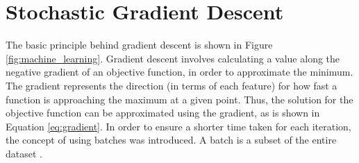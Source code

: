 \documentclass[letterpaper]{article} %
\begin{document}

\section{Stochastic Gradient Descent}
The basic principle behind gradient descent is shown in Figure \ref{fig:machine_learning}.
Gradient descent involves calculating
a value along the negative gradient of an objective function, in order to approximate
the minimum.
The gradient represents the direction (in terms of each feature)
for how fast a function is approaching the maximum at a given point.
Thus, the solution for the objective function
can be approximated using the gradient, as is shown in Equation \ref{eq:gradient}.
In order to ensure a shorter time taken for each iteration,
the concept of using batches was introduced.
A batch is a subset of the entire dataset \cite{machine_learning}.
\end{document}
